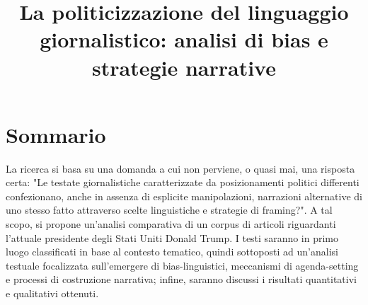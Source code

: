 \documentclass[12pt,a4paper,twoside,openright]{extreport}
\title{La politicizzazione del linguaggio giornalistico: analisi di bias e strategie narrative}
\begin{document}
    \pagestyle{empty}
    
    
    \cleardoublepage
    
    
    \cleardoublepage
    
    \pagestyle{plain}
    
    \chapter*{Sommario}
    La ricerca si basa su una domanda a cui non perviene, o quasi mai, una risposta certa: "Le testate giornalistiche caratterizzate da posizionamenti politici differenti confezionano, anche in assenza di esplicite manipolazioni, narrazioni alternative di uno stesso fatto attraverso scelte linguistiche e strategie di \gls{framing}?". A tal scopo, si propone un’analisi comparativa di un \gls{corpus} di articoli riguardanti l’attuale presidente degli Stati Uniti Donald Trump. 
    I testi saranno in primo luogo classificati in base al contesto tematico, quindi sottoposti ad un’analisi testuale focalizzata sull’emergere di \gls{bias-linguistici}, meccanismi di \gls{agenda-setting} e processi di costruzione narrativa; infine, saranno discussi i risultati quantitativi e qualitativi ottenuti.
    \cleardoublepage
    

    \listoftables
    \cleardoublepage

    \listoffigures
    \cleardoublepage
    
    \tableofcontents
    
    
    
    
    
    
    
    
    
    \cleardoublepage
    
    \printglossaries       %
    \printbibliography[heading=bibintoc] %
\end{document}
